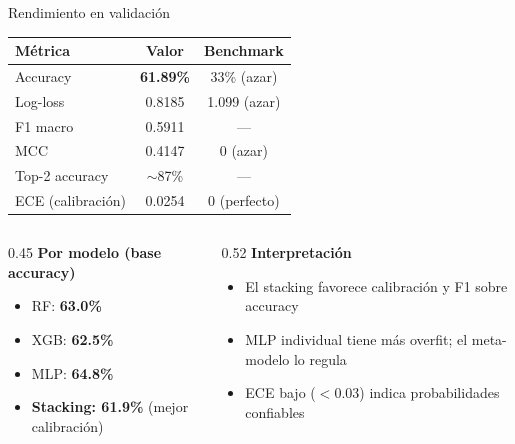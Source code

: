 \documentclass[aspectratio=169,10pt]{beamer}
\newcommand{\pct}[1]{\textbf{#1\%}}
\begin{document}
\begin{frame}{Rendimiento en validación}
  \centering
  \begin{tabular}{lcc}
    \toprule
    \textbf{Métrica} & \textbf{Valor} & \textbf{Benchmark} \\
    \midrule
    Accuracy            & \pct{61.89} & 33\% (azar) \\
    Log-loss            & 0.8185      & 1.099 (azar) \\
    F1 macro            & 0.5911      & --- \\
    MCC                 & 0.4147      & 0 (azar) \\
    Top-2 accuracy      & $\sim$87\%  & --- \\
    ECE (calibración)   & 0.0254      & 0 (perfecto) \\
    \bottomrule
  \end{tabular}

  \vspace{0.3cm}
  \begin{columns}[T]
    \begin{column}{0.45\textwidth}
      {\small\textbf{Por modelo (base accuracy)}}
      \begin{itemize}\tiny
        \item RF: \pct{63.0}
        \item XGB: \pct{62.5}
        \item MLP: \pct{64.8}
        \item \textbf{Stacking: \pct{61.9}} (mejor calibración)
      \end{itemize}
    \end{column}
    \begin{column}{0.52\textwidth}
      {\small\textbf{Interpretación}}
      \begin{itemize}\tiny
        \item El stacking favorece calibración y F1 sobre accuracy
        \item MLP individual tiene más overfit; el meta-modelo lo regula
        \item ECE bajo ($<$0.03) indica probabilidades confiables
      \end{itemize}
    \end{column}
  \end{columns}
\end{frame}
\end{document}
